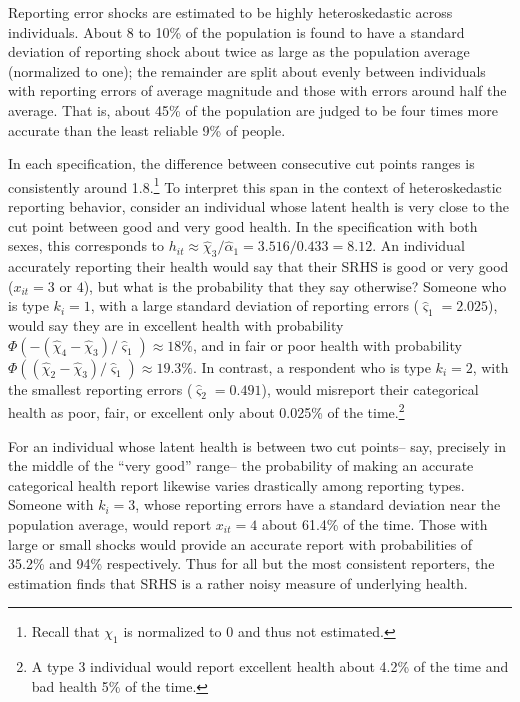\documentclass[12pt,pdftex,letterpaper]{article}
\newcommand{\Health}{h}
\newcommand{\Report}{x}
\newcommand{\Cut}{\chi}
\newcommand{\LatentParam}{\alpha}
\newcommand{\ReportStd}{\varsigma}
\begin{document}
Reporting error shocks are estimated to be highly heteroskedastic across individuals. About 8 to 10\% of the population is found to have a standard deviation of reporting shock about twice as large as the population average (normalized to one); the remainder are split about evenly between individuals with reporting errors of average magnitude and those with errors around half the average. That is, about 45\% of the population are judged to be four times more accurate than the least reliable 9\% of people.

In each specification, the difference between consecutive cut points ranges is consistently around 1.8.\footnote{Recall that $\Cut_1$ is normalized to 0 and thus not estimated.} To interpret this span in the context of heteroskedastic reporting behavior, consider an individual whose latent health is very close to the cut point between good and very good health. In the specification with both sexes, this corresponds to $\Health_{it} \approx \hat{\Cut}_3 / \hat{\LatentParam}_1 = 3.516 / 0.433 = 8.12$. An individual accurately reporting their health would say that their SRHS is good or very good ($\Report_{it}=3$ or $4$), but what is the probability that they say otherwise? Someone who is type $k_i=1$, with a large standard deviation of reporting errors ($\hat{\ReportStd}_1 = 2.025$), would say they are in excellent health with probability $\Phi(-(\hat{\Cut}_4 - \hat{\Cut}_3)/\hat{\ReportStd}_1) \approx 18\%$, and in fair or poor health with probability $\Phi((\hat{\Cut}_2 - \hat{\Cut}_3)/\hat{\ReportStd}_1) \approx 19.3\%$. In contrast, a respondent who is type $k_i = 2$, with the smallest reporting errors ($\hat{\ReportStd}_2 = 0.491$), would misreport their categorical health as poor, fair, or excellent only about 0.025\% of the time.\footnote{A type 3 individual would report excellent health about 4.2\% of the time and bad health 5\% of the time.}

For an individual whose latent health is between two cut points-- say, precisely in the middle of the ``very good'' range-- the probability of making an accurate categorical health report likewise varies drastically among reporting types. Someone with $k_i=3$, whose reporting errors have a standard deviation near the population average, would report $\Report_{it}=4$ about 61.4\% of the time. Those with large or small shocks would provide an accurate report with probabilities of 35.2\% and 94\% respectively. Thus for all but the most consistent reporters, the estimation finds that SRHS is a rather noisy measure of underlying health.
\end{document}
